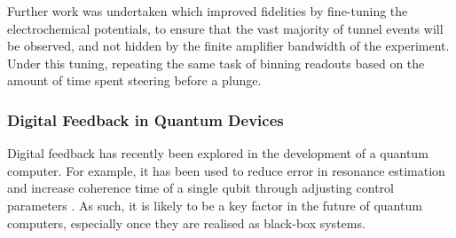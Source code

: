 Further work was undertaken which improved fidelities by fine-tuning the electrochemical potentials, to ensure that the vast majority of tunnel events will be observed, and not hidden by the finite amplifier bandwidth of the experiment. Under this tuning, repeating the same task of binning readouts based on the amount of time spent steering before a plunge.



\subsubsection{Digital Feedback in Quantum Devices}

Digital feedback has recently been explored in the development of a quantum computer. For example, it has been used to reduce error in resonance estimation \cite{bonato2015optimized} and increase coherence time of a single qubit through adjusting control parameters \cite{shulman2014suppressing}. As such, it is likely to be a key factor in the future of quantum computers, especially once they are realised as black-box systems.
